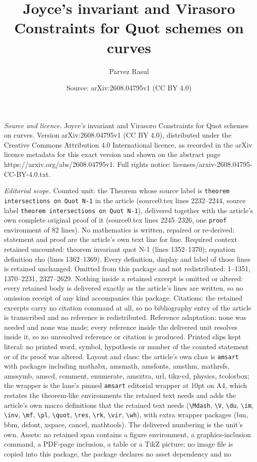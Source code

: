 \documentclass[10pt,a4paper]{amsart}
\title[Joyce's invariant and Virasoro Constraints for Quot schemes ]{Joyce's invariant and Virasoro Constraints for Quot schemes on curves}
\author{Parvez Rasul}
\date{Source: arXiv:2608.04795v1 (CC BY 4.0)}
\begin{document}
\maketitle

\noindent\emph{Source and licence.} Joyce's invariant and Virasoro Constraints for Quot schemes on curves. Version arXiv:2608.04795v1 (CC BY 4.0), distributed under the Creative Commons Attribution 4.0 International licence, as recorded in the arXiv licence metadata for this exact version and shown on the abstract page https://arxiv.org/abs/2608.04795v1. Full rights notice: licenses/arxiv-2608.04795-CC-BY-4.0.txt.\par\smallskip

\noindent\textit{Editorial scope.} Counted unit: the Theorem whose source label is \texttt{theorem intersections on Quot N-1} in the article (source0.tex lines 2232--2244, source label \texttt{theorem intersections on Quot N-1}), delivered together with the article's own complete original proof of it (source0.tex lines 2245--2326, one \texttt{proof} environment of 82 lines). No mathematics is written, repaired or re-derived: statement and proof are the article's own text line for line. Required context retained uncounted: theorem invariant quot N-1 (lines 1352--1370); equation definition rho (lines 1362--1369). Every definition, display and label of those lines is retained unchanged. Omitted from this package and not redistributed: 1--1351, 1370--2231, 2327--2629. Nothing inside a retained excerpt is omitted or altered: every retained body is delivered exactly as the article's lines are written, so no omission receipt of any kind accompanies this package. Citations: the retained excerpts carry no citation command at all, so no bibliography entry of the article is transcribed and no reference is redistributed. Reference adaptation: none was needed and none was made; every reference inside the delivered unit resolves inside it, so no unresolved reference or citation is produced. Printed slips kept literal: no printed word, symbol, hypothesis or number of the counted statement or of its proof was altered. Layout and class: the article's own class is \texttt{amsart} with packages including mathabx, amsmath, amsfonts, amsthm, mathrsfs, amssymb, amscd, comment, enumerate, amsxtra, url, tikz-cd, physics, tcolorbox; the wrapper is the lane's pinned \texttt{amsart} editorial wrapper at 10pt on A4, which restates the theorem-like environments the retained text needs and adds the article's own macro definitions that the retained text needs (\texttt{\textbackslash Mdash}, \texttt{\textbackslash V}, \texttt{\textbackslash du}, \texttt{\textbackslash im}, \texttt{\textbackslash inv}, \texttt{\textbackslash mf}, \texttt{\textbackslash pl}, \texttt{\textbackslash quot}, \texttt{\textbackslash res}, \texttt{\textbackslash rk}, \texttt{\textbackslash vir}, \texttt{\textbackslash wh}), with extra wrapper packages (bm, bbm, dsfont, xspace, cancel, mathtools). The delivered numbering is the unit's own. Assets: no retained span contains a figure environment, a graphics-inclusion command, a PDF-page inclusion, a table or a TikZ picture; no image file is copied into this package, the package declares no asset dependency and no 
\end{document}
